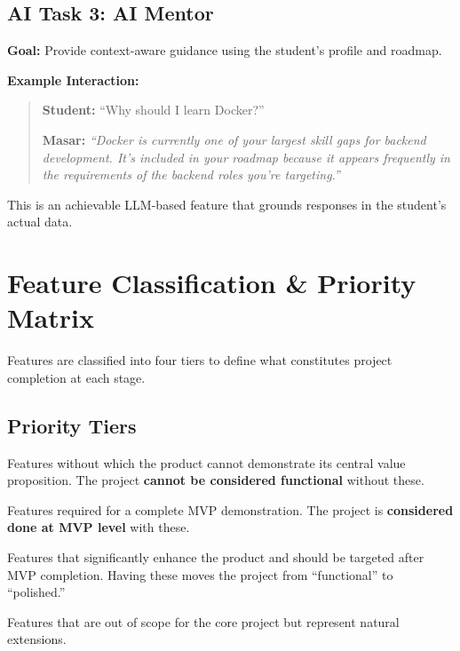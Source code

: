 \documentclass[12pt,a4paper]{article}
\begin{document}
\subsection{AI Task 3: AI Mentor}
\label{sec:ai-mentor}

\textbf{Goal:} Provide context-aware guidance using the student's profile and roadmap.

\bigskip
\noindent\textbf{Example Interaction:}

\begin{quote}
\textbf{Student:} ``Why should I learn Docker?''

\textbf{Masar:} \textit{``Docker is currently one of your largest skill gaps for backend development. It's included in your roadmap because it appears frequently in the requirements of the backend roles you're targeting.''}
\end{quote}

\noindent This is an achievable LLM-based feature that grounds responses in the student's actual data.

\newpage

\section{Feature Classification \& Priority Matrix}

Features are classified into four tiers to define what constitutes project completion at each stage.

\subsection{Priority Tiers}

\begin{description}[style=nextline, leftmargin=2cm]
  \item[\textcolor{masarred}{\textbf{MVP -- Core}}]
    Features without which the product cannot demonstrate its central value proposition. The project \textbf{cannot be considered functional} without these.

  \item[\textcolor{masarorange}{\textbf{MVP}}]
    Features required for a complete MVP demonstration. The project is \textbf{considered done at MVP level} with these.

  \item[\textcolor{masarblue}{\textbf{Should Have}}]
    Features that significantly enhance the product and should be targeted after MVP completion. Having these moves the project from ``functional'' to ``polished.''

  \item[\textcolor{masargray}{\textbf{Nice to Have / Later}}]
    Features that are out of scope for the core project but represent natural extensions.
\end{description}
\end{document}
